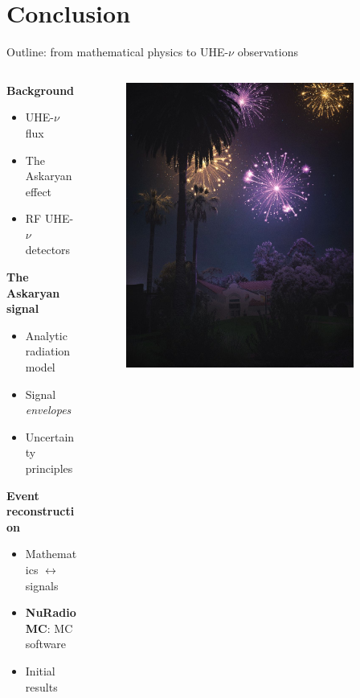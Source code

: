 \documentclass{beamer}
\begin{document}
\section{Conclusion}

\begin{frame}{Outline: from mathematical physics to UHE-$\nu$ observations}
\begin{columns}[T]
\begin{column}{0.5\textwidth}
\textbf{\alert{Background}}
\begin{itemize}
\item UHE-$\nu$ flux
\item The Askaryan effect
\item RF UHE-$\nu$ detectors
\end{itemize}
\textbf{\alert{The Askaryan signal}}
\begin{itemize}
\item Analytic radiation model
\item Signal \textit{envelopes}
\item Uncertainty principles
\end{itemize}
\textbf{\alert{Event reconstruction}}
\begin{itemize}
\item Mathematics $\leftrightarrow$ signals
\item \textbf{NuRadioMC}: MC software
\item Initial results
\end{itemize}
\end{column}
\begin{column}{0.5\textwidth}
\begin{figure}
\centering
\includegraphics[width=0.9\textwidth]{whittier2.jpeg}

\end{figure}
\end{column}
\end{columns}
\end{frame}
\end{document}
